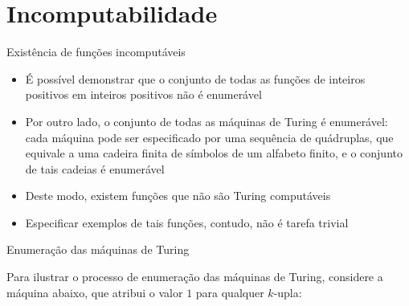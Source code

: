 \section{Incomputabilidade}

\begin{frame}[fragile]{Existência de funções incomputáveis}

    \begin{itemize}
        \item É possível demonstrar que o conjunto de todas as funções de inteiros positivos em
            inteiros positivos não é enumerável

        \item Por outro lado, o conjunto de todas as máquinas de Turing é enumerável: cada 
            máquina pode ser especificado por uma sequência de quádruplas, que equivale a 
            uma cadeira finita de símbolos de um alfabeto finito, e o conjunto de tais cadeias
            é enumerável

        \item Deste modo, existem funções que não são Turing computáveis

        \item Especificar exemplos de tais funções, contudo, não é tarefa trivial
    \end{itemize}

\end{frame}

\begin{frame}[fragile]{Enumeração das máquinas de Turing}

    Para ilustrar o processo de enumeração das máquinas de Turing, considere a máquina abaixo,
    que atribui o valor $1$ para qualquer $k$-upla:

    \vspace{0.3in}

    \begin{figure}[h]
        \centering
    \end{figure}

\end{frame}

